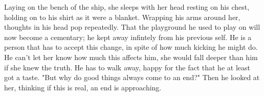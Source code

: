 \begin{Document}
            Laying on the bench of the ship, she sleeps with her head resting on his chest, holding on to his shirt as it were a blanket. Wrapping his arms around
        her, thoughts in his head pop repeatedly. That the playground he used to play on will now become a cementary; he kept away infintely from his previous
        self. He is a person that has to accept this change, in spite of how much kicking he might do. He can't let her know how much this affects him, she
        would fall deeper than him if she knew the truth. He has to walk away, happy for the fact that he at least got a taste. "But why do good things always
        come to an end?" Then he looked at her, thinking if this is real, an end is approaching.
\end{Document}
